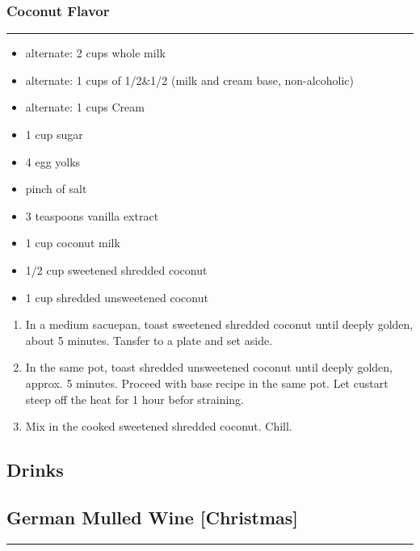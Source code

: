 \documentclass{article}
\begin{document}
\subsubsection{Coconut Flavor}
\noindent\rule[0.5ex]{\linewidth}{0.5pt}
\begin{framed}
    \begin{itemize}
        \item alternate: 2 cups whole milk
        \item alternate: 1 cups of 1/2\&1/2 (milk and cream base, non-alcoholic)
        \item alternate: 1 cups Cream
        \item 1 cup sugar
        \item 4 egg yolks
        \item pinch of salt
        \item 3 teaspoons vanilla extract
        \item 1 cup coconut milk
        \item 1/2 cup sweetened shredded coconut 
        \item 1 cup shredded unsweetened coconut
    \end{itemize}
\end{framed}
\begin{enumerate}
    \item 
        In a medium sacuepan, toast sweetened shredded coconut until deeply golden, about 5 minutes. Tansfer to a plate and set aside.
    \item 
        In the same pot, toast shredded unsweetened coconut until deeply golden, approx. 5 minutes. Proceed with base recipe in the same pot. Let custart steep off the heat for 1 hour befor straining. 
    \item 
        Mix in the cooked sweetened shredded coconut. Chill.

\end{enumerate}
\newpage

\vspace*{\fill}
\begin{center}
    \section{Drinks}
\end{center}
\vspace*{\fill}
\newpage

\subsection{German Mulled Wine [Christmas]}
\noindent\rule[0.5ex]{\linewidth}{1pt}
\end{document}

